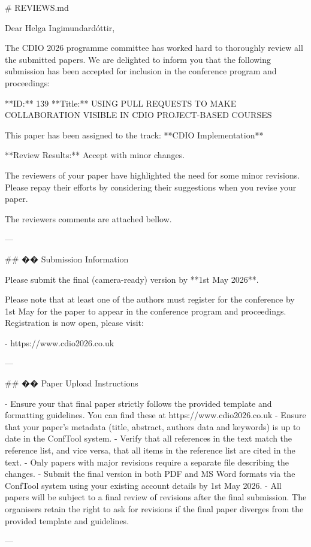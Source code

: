 # REVIEWS.md

Dear Helga Ingimundardóttir,

The CDIO 2026 programme committee has worked hard to thoroughly review all the submitted papers. We are delighted to inform you that the following submission has been accepted for inclusion in the conference program and proceedings:

**ID:** 139  
**Title:** USING PULL REQUESTS TO MAKE COLLABORATION VISIBLE IN CDIO PROJECT-BASED COURSES  

This paper has been assigned to the track: **CDIO Implementation**

**Review Results:** Accept with minor changes.

The reviewers of your paper have highlighted the need for some minor revisions. Please repay their efforts by considering their suggestions when you revise your paper.

The reviewers comments are attached bellow.

---

## �� Submission Information

Please submit the final (camera-ready) version by **1st May 2026**.

Please note that at least one of the authors must register for the conference by 1st May for the paper to appear in the conference program and proceedings. Registration is now open, please visit:

- https://www.cdio2026.co.uk

---

## �� Paper Upload Instructions

- Ensure your that final paper strictly follows the provided template and formatting guidelines. You can find these at https://www.cdio2026.co.uk  
- Ensure that your paper's metadata (title, abstract, authors data and keywords) is up to date in the ConfTool system.  
- Verify that all references in the text match the reference list, and vice versa, that all items in the reference list are cited in the text.  
- Only papers with major revisions require a separate file describing the changes.  
- Submit the final version in both PDF and MS Word formats via the ConfTool system using your existing account details by 1st May 2026.  
- All papers will be subject to a final review of revisions after the final submission. The organisers retain the right to ask for revisions if the final paper diverges from the provided template and guidelines.  

---

